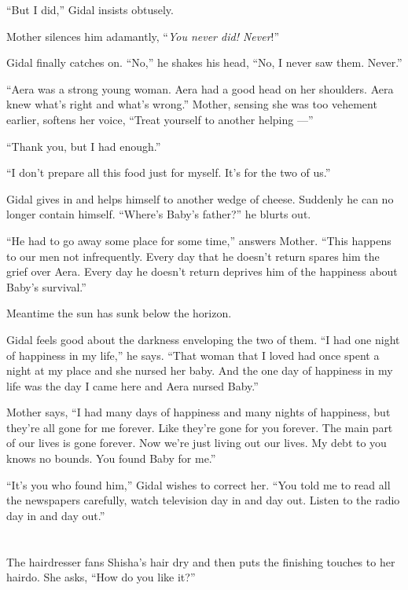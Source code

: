 \documentclass[twoside,11pt]{book}
\begin{document}
``But I did,'' Gidal insists obtusely.

Mother silences him adamantly, ``\textit{You never did! Never}!''

Gidal finally catches on. ``No,'' he shakes his head, ``No, I never saw them. Never.''

``Aera was a strong young woman. Aera had a good head on her shoulders. Aera knew what's right and what's
wrong.'' Mother, sensing she was too vehement earlier, softens her voice, ``Treat yourself to
another helping ---''

``Thank you, but I had enough.''

``I don't prepare all this food just for myself. It's for the two of us.''

Gidal gives in and helps himself to another wedge of cheese. Suddenly he can no longer contain
himself.  ``Where's Baby's father?'' he blurts out.

``He had to go away some place for some time,'' answers Mother. ``This happens to
our men not infrequently. Every day that he doesn't return spares him the grief over Aera. Every day he doesn't return
deprives him of the happiness about Baby's survival.''

Meantime the sun has sunk below the horizon.

Gidal feels good about the darkness enveloping the two of them. ``I had one night of happiness in my
life,'' he says. ``That woman that I loved had once spent a night at my place and she nursed
her baby.  And the{ }one day\textit{ }of happiness in my life was the day I
came here and Aera nursed Baby.''

Mother says, ``I had many days of happiness and many nights of happiness, but they're all gone for me
forever. Like they're gone for you forever. The main part of our lives is gone forever. Now we're just living out our
lives. My debt to you knows no bounds. You found Baby for me.''

``It's you who found him,'' Gidal wishes to correct her. ``You told me to read
all the newspapers carefully, watch television day in and day out.
Listen to the radio day in and day out.''



\chapter{}

The hairdresser fans Shisha's hair dry and then puts the finishing touches to her hairdo. She asks, ``How
do you like it?''
\end{document}
